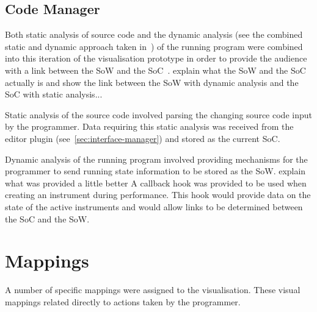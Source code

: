 \subsection{Code Manager}

Both static analysis of source code and the dynamic analysis (see the combined static and dynamic approach taken in~\cite{Eisenbarth2003}) of the running program were combined into this iteration of the visualisation prototype in order to provide the audience with a link between the \ac{SoW} and the \ac{SoC}~\cite{Swift2013}. {\color{red} explain what the \ac{SoW} and the \ac{SoC} actually is and show the link between the \ac{SoW} with dynamic analysis and the \ac{SoC} with static analysis...}

Static analysis of the source code involved parsing the changing source code input by the programmer. Data requiring this static analysis was received from the editor plugin (see~\ref{sec:interface-manager}) and stored as the current \ac{SoC}.

Dynamic analysis of the running program involved providing mechanisms for the programmer to send running state information to be stored as the \ac{SoW}. {\color{red} explain what was provided a little better} A callback hook was provided to be used when creating an instrument during performance. This hook would provide data on the state of the active instruments and would allow links to be determined between the \ac{SoC} and the \ac{SoW}.

\section{Mappings}

A number of specific mappings were assigned to the visualisation. These visual mappings related directly to actions taken by the programmer. 


